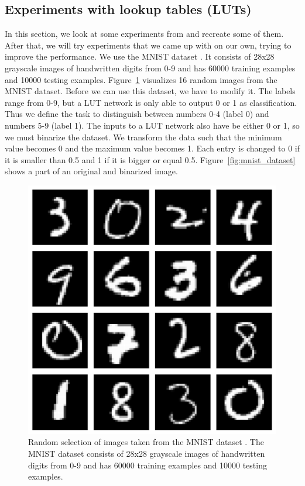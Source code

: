 \subsection{Experiments with lookup tables (LUTs)}
In this section, we look at some experiments from \cite{bib:chatterjee2018learning} and recreate some of them. After that, we will try experiments that we came up with on our own, trying to improve the performance. We use the MNIST dataset \cite{bib:mnist}. It consists of 28x28 grayscale images of handwritten digits from 0-9 and has 60000 training examples and 10000 testing examples. Figure~\ref{fig:mnist} visualizes 16 random images from the MNIST dataset. Before we can use this dataset, we have to modify it. The labels range from 0-9, but a LUT network is only able to output 0 or 1 as classification. Thus we define the task to distinguish between numbers 0-4 (label 0) and numbers 5-9 (label 1). The inputs to a LUT network also have be either 0 or 1, so we must binarize the dataset. We transform the data such that the minimum value becomes 0 and the maximum value becomes 1. Each entry is changed to 0 if it is smaller than 0.5 and 1 if it is bigger or equal 0.5. Figure~\ref{fig:mnist_dataset} shows a part of an original and binarized image.

\begin{figure}[!htb]
    \centering
      \includegraphics[width=.6\linewidth]{images/mnist.pdf}
      \caption{Random selection of images taken from the MNIST dataset \cite{bib:mnist}. The MNIST dataset consists of 28x28 grayscale images of handwritten digits from 0-9 and has 60000 training examples and 10000 testing examples.}
\label{fig:mnist}
\end{figure}
\FloatBarrier

